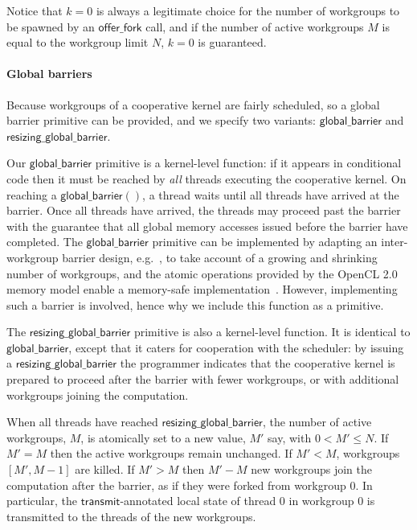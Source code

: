 \documentclass[numbers,nocopyrightspace,10pt]{sigplanconf}
\newcommand{\mysec}{Sec.~}
\newcommand{\transmit}{\mathsf{transmit}}
\newcommand{\offerfork}{\mathsf{offer\_fork}}
\newcommand{\globalbarrier}{\mathsf{global\_barrier}}
\newcommand{\resizingglobalbarrier}{\mathsf{resizing\_global\_barrier}}
\begin{document}

Notice that $k=0$ is always a legitimate choice for the number of
workgroups to be spawned by an $\offerfork$ call, and if the number of
active workgroups $M$ is equal to the workgroup limit $N$, $k=0$ is
guaranteed.

\paragraph{Global barriers}

Because workgroups of a cooperative kernel are fairly scheduled, so a
global barrier primitive can be provided, and we specify two variants: $\globalbarrier$
and $\resizingglobalbarrier$.

Our $\globalbarrier$ primitive is a kernel-level function: if it
appears in conditional code then it must be reached by \emph{all}
threads executing the cooperative kernel.  On reaching a
$\globalbarrier()$, a thread waits until all threads have arrived at
the barrier.  Once all threads have arrived, the threads may proceed
past the barrier with the guarantee that all global memory accesses
issued before the barrier have completed.  The $\globalbarrier$
primitive can be implemented by adapting an inter-workgroup barrier
design, e.g.~\cite{XF10}, to take account of a growing and shrinking number of workgroups, and the atomic operations provided by
the OpenCL 2.0 memory model enable a memory-safe
implementation~\cite{DBLP:conf/oopsla/SorensenDBGR16}.  However, implementing such a barrier is
involved, hence why we include this function as a primitive.

The $\resizingglobalbarrier$ primitive is also a kernel-level
function.  It is identical to $\globalbarrier$, except that it caters
for cooperation with the scheduler: by issuing a
$\resizingglobalbarrier$ the programmer indicates that the cooperative
kernel is prepared to proceed after the barrier with fewer workgroups,
or with additional workgroups joining the computation.

When all threads have reached $\resizingglobalbarrier$,
the number of active workgroups, $M$, is atomically set to a new value, $M'$ say, with $0 < M' \leq N$.
If $M' = M$ then the active workgroups remain unchanged.  If $M' < M$, workgroups $[M', M-1]$ are
killed.  If $M' > M$ then $M'-M$ new workgroups join the computation after the barrier,
as if they were forked from workgroup 0.  In particular, the
$\transmit$-annotated local state of thread 0 in workgroup 0 is
transmitted to the threads of the new workgroups.
\end{document}
